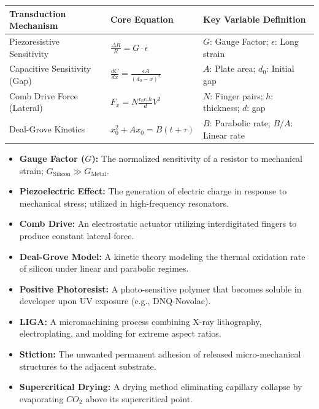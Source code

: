 \documentclass[12pt,a4paper]{article}
\renewcommand{\arraystretch}{1.45}
\begin{document}
\begin{tcolorbox}[formulabox, title={\textbf{Key Transduction Formulas}}]
\renewcommand{\arraystretch}{1.3}
\begin{tabularx}{\linewidth}{B{3.8cm} Y Y}
\textbf{Transduction Mechanism} & \textbf{Core Equation} & \textbf{Key Variable Definition} \\
\hline
Piezoresistive Sensitivity & $\displaystyle\frac{\Delta R}{R} = G \cdot \epsilon$ & $G$: Gauge Factor; $\epsilon$: Long strain \\[8pt]
Capacitive Sensitivity (Gap) & $\displaystyle\frac{dC}{dx} = \frac{\epsilon A}{(d_0 - x)^2}$ & $A$: Plate area; $d_0$: Initial gap \\[8pt]
Comb Drive Force (Lateral) & $\displaystyle F_x = N \frac{\epsilon_0 \epsilon_r h}{d} V^2$ & $N$: Finger pairs; $h$: thickness; $d$: gap \\[8pt]
Deal-Grove Kinetics & $x_0^2 + A x_0 = B(t + \tau)$ & $B$: Parabolic rate; $B/A$: Linear rate \\[2pt]
\end{tabularx}
\end{tcolorbox}

\begin{tcolorbox}[defbox, title={\textbf{One-Line Definitions}}]
\begin{itemize}[leftmargin=*, itemsep=2.5pt, topsep=0pt]
  \item \textbf{Gauge Factor ($G$):} The normalized sensitivity of a resistor to mechanical strain; $G_{\text{Silicon}} \gg G_{\text{Metal}}$.
  \item \textbf{Piezoelectric Effect:} The generation of electric charge in response to mechanical stress; utilized in high-frequency resonators.
  \item \textbf{Comb Drive:} An electrostatic actuator utilizing interdigitated fingers to produce constant lateral force.
  \item \textbf{Deal-Grove Model:} A kinetic theory modeling the thermal oxidation rate of silicon under linear and parabolic regimes.
  \item \textbf{Positive Photoresist:} A photo-sensitive polymer that becomes soluble in developer upon UV exposure (e.g., DNQ-Novolac).
  \item \textbf{LIGA:} A micromachining process combining X-ray lithography, electroplating, and molding for extreme aspect ratios.
  \item \textbf{Stiction:} The unwanted permanent adhesion of released micro-mechanical structures to the adjacent substrate.
  \item \textbf{Supercritical Drying:} A drying method eliminating capillary collapse by evaporating $CO_2$ above its supercritical point.
\end{itemize}
\end{tcolorbox}
\end{document}
